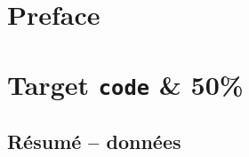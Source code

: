 \documentclass{article}
\begin{document}
\setcounter{page}{3}
\section*{Preface}\label{sec:preface}
\newpage
{}\setcounter{page}{40}
\section{Target \texttt{code} \& 50\%}\label{sec:target}
\subsection{R\'esum\'e -- donn\'ees}\label{sec:unicode}
\end{document}

